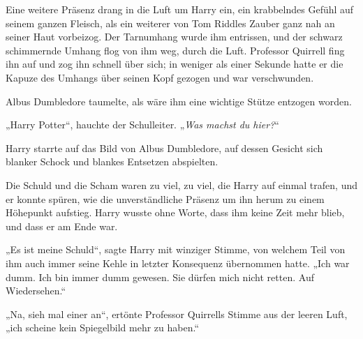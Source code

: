Eine weitere Präsenz drang in die Luft um Harry ein, ein krabbelndes Gefühl auf seinem ganzen Fleisch, als ein weiterer von Tom Riddles Zauber ganz nah an seiner Haut vorbeizog. Der Tarnumhang wurde ihm entrissen, und der schwarz schimmernde Umhang flog von ihm weg, durch die Luft.
Professor Quirrell fing ihn auf und zog ihn schnell über sich; in weniger als einer Sekunde hatte er die Kapuze des Umhangs über seinen Kopf gezogen und war verschwunden.

Albus Dumbledore taumelte, als wäre ihm eine wichtige Stütze entzogen worden.

„Harry Potter“, hauchte der Schulleiter.
„\emph{Was machst du hier?}“

Harry starrte auf das Bild von Albus Dumbledore, auf dessen Gesicht sich blanker Schock und blankes Entsetzen abspielten.

Die Schuld und die Scham waren zu viel, zu viel, die Harry auf einmal trafen, und er konnte spüren, wie die unverständliche Präsenz um ihn herum zu einem Höhepunkt aufstieg. Harry wusste ohne Worte, dass ihm keine Zeit mehr blieb, und dass er am Ende war.

„Es ist meine Schuld“, sagte Harry mit winziger Stimme, von welchem Teil von ihm auch immer seine Kehle in letzter Konsequenz übernommen hatte.
„Ich war dumm. Ich bin immer dumm gewesen. Sie dürfen mich nicht retten. Auf Wiedersehen.“

„Na, sieh mal einer an“, ertönte Professor Quirrells Stimme aus der leeren Luft, „ich scheine kein Spiegelbild mehr zu haben.“

